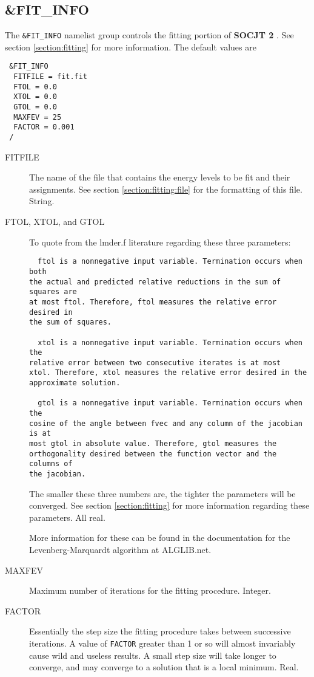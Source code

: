 \documentclass{article}
\newcommand{\socjttwo}{{\bf SOCJT 2}}
\begin{document}
\subsection{\&FIT\_INFO} \label{fitinfo}

The {\tt \&FIT\_INFO} namelist group controls the fitting portion of \socjttwo
. See section \ref{section:fitting} for more information. The default values are

\begin{verbatim}
 &FIT_INFO
  FITFILE = fit.fit
  FTOL = 0.0
  XTOL = 0.0
  GTOL = 0.0
  MAXFEV = 25
  FACTOR = 0.001
 /
\end{verbatim}

\begin{description}

\item[FITFILE] The name of the file that contains the energy levels
  to be fit and their assignments.  See section \ref{section:fitting:file} for
  the formatting of this file. String.

\item[FTOL, XTOL, and GTOL] To quote from the lmder.f
  literature regarding these three parameters:
  \begin{verbatim}
  ftol is a nonnegative input variable. Termination occurs when both
the actual and predicted relative reductions in the sum of squares are
at most ftol. Therefore, ftol measures the relative error desired in
the sum of squares. 

  xtol is a nonnegative input variable. Termination occurs when the
relative error between two consecutive iterates is at most
xtol. Therefore, xtol measures the relative error desired in the
approximate solution. 

  gtol is a nonnegative input variable. Termination occurs when the
cosine of the angle between fvec and any column of the jacobian is at
most gtol in absolute value. Therefore, gtol measures the
orthogonality desired between the function vector and the columns of
the jacobian. 
 \end{verbatim}

 The smaller these three numbers are, the tighter the parameters will
 be converged. See section \ref{section:fitting} for more
 information regarding these parameters. All real.
 
 More information for these can be found in the documentation for the Levenberg-Marquardt algorithm at ALGLIB.net.\cite{alglib}

\item[MAXFEV] Maximum number of iterations for the fitting
  procedure. Integer.

\item[FACTOR] Essentially the step size the fitting procedure takes
  between successive iterations. A value of {\tt FACTOR} greater than 1 or
  so will almost invariably cause wild and useless results. A small
  step size will take longer to converge, and may converge to a
  solution that is a local minimum. Real.

\end{description}
\end{document}
